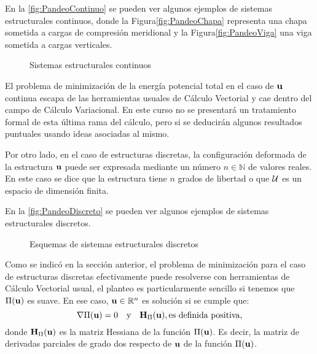 En la \autoref{fig:PandeoContinuo} se pueden ver algunos ejemplos de sistemas estructurales continuos, donde la Figura\autoref{fig:PandeoChapa} representa una chapa sometida a cargas de compresión meridional y la Figura\autoref{fig:PandeoViga} una viga sometida a cargas verticales.

\begin{figure}[htb]
	\centering
{}
\hspace{1em}
\caption{Sistemas estructurales continuos}
	\label{fig:PandeoContinuo}
\end{figure}

El problema de minimización de la energía potencial total en el caso de ${\bf u}$ continua escapa de las herramientas usuales de Cálculo Vectorial y cae dentro del campo de Cálculo Variacional. En este curso no se presentará un tratamiento formal de esta última rama del cálculo, pero si se deducirán algunos resultados puntuales usando ideas asociadas al mismo.

Por otro lado, en el caso de estructuras discretas, la configuración deformada de la estructura ${\bf u}$ puede ser expresada mediante un número $n\in\mathbb{N}$ de valores reales. En este caso se dice que la estructura tiene $n$ grados de libertad o que ${\mathcal U}$ es un espacio de dimensión finita.

En la \autoref{fig:PandeoDiscreto} se pueden ver algunos ejemplos de sistemas estructurales discretos.

\begin{figure}[htb]
	\centering
{}
\hspace{6em}
\caption{Esquemas de sistemas estructurales discretos}
	\label{fig:PandeoDiscreto}
\end{figure}

Como se indicó en la sección anterior, el problema de minimización para el caso de estructuras discretas efectivamente puede resolverse con herramientas de Cálculo Vectorial usual, el planteo es particularmente sencillo si tenemos que $\Pi({\bf u})$ es suave. En ese caso, ${\bf u} \in \mathbb{R}^n$ es solución si se cumple que:
%
$$\nabla \Pi({\bf u})=0 \quad \text{y} \quad  {\bf H}_\Pi ({\bf u}), \text{es definida positiva},$$
%
donde ${\bf H}_\Pi({\bf u})$ es la matriz Hessiana de la función $\Pi({\bf u})$. Es decir, la matriz de derivadas parciales de grado dos respecto de ${\bf u}$ de la función $\Pi({\bf u})$.

